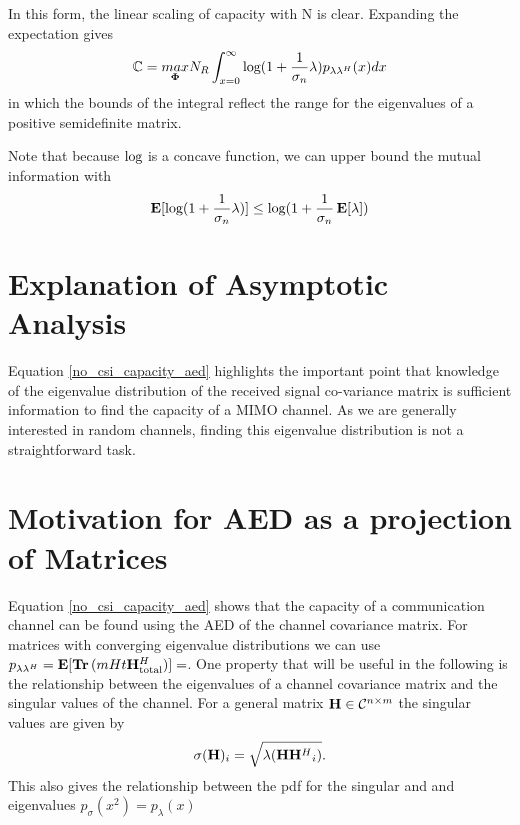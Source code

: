 \documentclass[12pt,a4paper]{report}
\begin{document}
In this form, the linear scaling of capacity with N is clear.
Expanding the expectation gives 
\begin{equation}\label{no_csi_capacity_aed}
\mathbb{C} = \underset{\boldsymbol{\Phi}}{\mathop{max}} N_R  \int_{x=0}^{\infty}\text{log{}}(1 + \frac{1}{\sigma_n}\lambda)p_{\lambda\lambda^H}(x) dx
\end{equation}
in which the bounds of the integral reflect the range for the eigenvalues of a positive semidefinite matrix. 

Note that because $\text{log{}}$ is a concave function, we can upper bound the mutual information with
\begin{equation}\label{mut_inf}
\mathop{\bf E{}}[\text{log{}}(1 + \frac{1}{\sigma_n}\lambda)] \leq \text{log{}}(1 + \frac{1}{\sigma_n}\mathop{\bf E{}}[\lambda])
\end{equation}

\section{Explanation of Asymptotic Analysis}
Equation \eqref{no_csi_capacity_aed} highlights the important point that knowledge of the eigenvalue distribution of the received signal co-variance matrix is sufficient information to find the capacity of a MIMO channel. As we are generally interested in random channels, finding this eigenvalue distribution is not a straightforward task.


\section{Motivation for AED as a projection of Matrices}
Equation \ref{no_csi_capacity_aed} shows that the capacity of a communication channel can be found using the AED of the channel covariance matrix.
For matrices with converging eigenvalue distributions we can use $p_{\lambda\lambda^H} = \mathop{\bf E{}}[\mathop{\bf Tr}{(mHt \mathbf{H}_\text{total}^H})] = $.
One property that will be useful in the following is the relationship between the eigenvalues of a channel covariance matrix and the singular values of
the channel.
For a general matrix $\mathbf{H} \in \mathcal{C}^{n \times m}$ the singular values are given by 
\begin{equation}\label{sigular_eigen}
\sigma(\mathbf{H})_i = \sqrt{\lambda({\mathbf{H}\mathbf{H}^H}_i)}.
\end{equation}
This also gives the relationship between the pdf for the singular and and eigenvalues $p_{\sigma}(x^2) = p_{\lambda}(x)$
\end{document}
